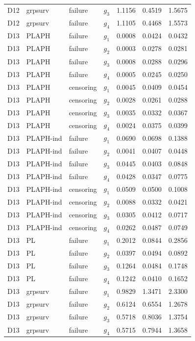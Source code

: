 \begin{longtable}{clllrrr}
D12 & grpsurv & failure & $g_{3}$ & 1.1156 & 0.4519 & 1.5675 \\
D12 & grpsurv & failure & $g_{4}$ & 1.1105 & 0.4468 & 1.5573 \\
D13 & PLAPH & failure & $g_{1}$ & 0.0008 & 0.0424 & 0.0432 \\
D13 & PLAPH & failure & $g_{2}$ & 0.0003 & 0.0278 & 0.0281 \\
D13 & PLAPH & failure & $g_{3}$ & 0.0008 & 0.0288 & 0.0296 \\
D13 & PLAPH & failure & $g_{4}$ & 0.0005 & 0.0245 & 0.0250 \\
D13 & PLAPH & censoring & $g_{1}$ & 0.0045 & 0.0409 & 0.0454 \\
D13 & PLAPH & censoring & $g_{2}$ & 0.0028 & 0.0261 & 0.0288 \\
D13 & PLAPH & censoring & $g_{3}$ & 0.0035 & 0.0332 & 0.0367 \\
D13 & PLAPH & censoring & $g_{4}$ & 0.0024 & 0.0375 & 0.0399 \\
D13 & PLAPH-ind & failure & $g_{1}$ & 0.0690 & 0.0698 & 0.1388 \\
D13 & PLAPH-ind & failure & $g_{2}$ & 0.0041 & 0.0407 & 0.0448 \\
D13 & PLAPH-ind & failure & $g_{3}$ & 0.0445 & 0.0403 & 0.0848 \\
D13 & PLAPH-ind & failure & $g_{4}$ & 0.0428 & 0.0347 & 0.0775 \\
D13 & PLAPH-ind & censoring & $g_{1}$ & 0.0509 & 0.0500 & 0.1008 \\
D13 & PLAPH-ind & censoring & $g_{2}$ & 0.0088 & 0.0332 & 0.0421 \\
D13 & PLAPH-ind & censoring & $g_{3}$ & 0.0305 & 0.0412 & 0.0717 \\
D13 & PLAPH-ind & censoring & $g_{4}$ & 0.0262 & 0.0487 & 0.0749 \\
D13 & PL & failure & $g_{1}$ & 0.2012 & 0.0844 & 0.2856 \\
D13 & PL & failure & $g_{2}$ & 0.0397 & 0.0494 & 0.0892 \\
D13 & PL & failure & $g_{3}$ & 0.1264 & 0.0484 & 0.1748 \\
D13 & PL & failure & $g_{4}$ & 0.1242 & 0.0410 & 0.1652 \\
D13 & grpsurv & failure & $g_{1}$ & 0.9829 & 1.3471 & 2.3300 \\
D13 & grpsurv & failure & $g_{2}$ & 0.6124 & 0.6554 & 1.2678 \\
D13 & grpsurv & failure & $g_{3}$ & 0.5718 & 0.8036 & 1.3754 \\
D13 & grpsurv & failure & $g_{4}$ & 0.5715 & 0.7944 & 1.3658 \\
\end{longtable}


